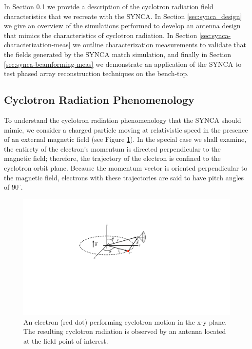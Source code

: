 In Section \ref{sec:pheno} we provide a description of the cyclotron radiation field characteristics that we recreate with the SYNCA. In Section \ref{sec:synca_design} we give an overview of the simulations performed to develop an antenna design that mimics the characteristics of cyclotron radiation. In Section \ref{sec:synca-characterization-meas} we outline characterization measurements to validate that the fields generated by the SYNCA match simulation, and finally in Section \ref{sec:synca-beamforming-meas} we demonstrate an application of the SYNCA to test phased array reconstruction techniques on the bench-top.

\subsection{Cyclotron Radiation Phenomenology}
\label{sec:pheno}

To understand the cyclotron radiation phenomenology that the SYNCA should mimic, we consider a charged particle moving at relativistic speed in the presence of an external magnetic field (see Figure \ref{fig:physics-situation}). In the special case we shall examine, the entirety of the electron's momentum is directed perpendicular to the magnetic field; therefore, the trajectory of the electron is confined to the cyclotron orbit plane. Because the momentum vector is oriented perpendicular to the magnetic field, electrons with these trajectories are said to have pitch angles of $90^\circ$. 

\begin{figure}[htbp]
\centering
\includegraphics[width=.5\textwidth]{figs/Chapter-5/221012_physical_situation.pdf}
\qquad
\caption{\label{fig:physics-situation} An electron (red dot) performing cyclotron motion in the x-y plane. The resulting cyclotron radiation is observed by an antenna located at the field point of interest. }
\end{figure}

